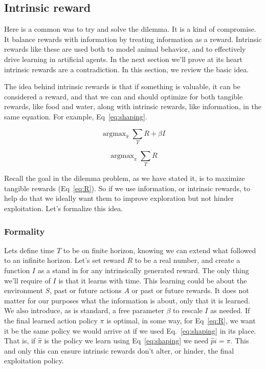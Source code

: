 \documentclass[9pt,lineno]{elife}
\DeclareMathOperator*{\argmax}{argmax}
\begin{document}
\subsection*{Intrinsic reward}
Here is a common was to try and solve the dilemma. It is a kind of compromise. It balance rewards with information by treating information as a reward. Intrinsic rewards like these are used both to model animal behavior, and to effectively drive learning in artificial agents. In the next section we'll prove at its heart intrinsic rewards are a contradiction. In this section, we review the basic idea.

The idea behind intrinsic rewards is that if something is valuable, it can be considered a reward, and that we can and should optimize for both tangible rewards, like food and water, along with intrinsic rewards, like information, in the same equation. For example, Eq~\ref{eq:shaping}. 

\begin{equation}
\label{eq:shaping}
\argmax_{\hat \pi} \sum_T R + \beta I
\end{equation}

\begin{equation}
\label{eq:R}
\argmax_{\pi} \sum_T R 
\end{equation}

Recall the goal in the dilemma problem, as we have stated it, is to maximize tangible rewards (Eq~\ref{eq:R}). So if we use information, or intrinsic rewards, to help do that we ideally want them to improve exploration but not hinder exploitation. Let's formalize this idea.

\subsubsection{Formality}
Lets define time $T$ to be on finite horizon, knowing we can extend what followed to an infinite horizon. Let's set reward $R$ to be a real number, and create a function $I$ as a stand in for any intrinsically generated reward. The only thing we'll require of $I$ is that it learns with time. This learning could be about the environment $S$, past or future actions $A$ or past or future rewards. It does not matter for our purposes what the information is about, only that it is learned. We also introduce, as is standard, a free parameter $\beta$ to rescale $I$ as needed. If the final learned action policy $\pi$ is optimal, in some way, for Eq~\ref{eq:R}, we want it be the same policy we would arrive at if we used Eq.~\ref{eq:shaping} in its place. That is, if $\hat \pi$ is the policy we learn using Eq~\ref{eq:shaping} we need $\hat pi = \pi$. This and only this can ensure intrinsic rewards don't alter, or hinder, the final exploitation policy.
\end{document}
